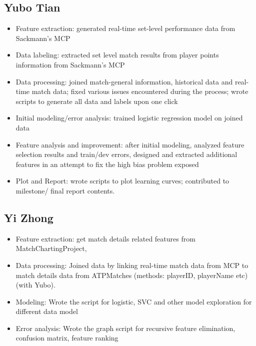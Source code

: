 \documentclass[paper=a4, fontsize=10pt]{scrartcl} %
\numberwithin{equation}{section} %
\numberwithin{figure}{section} %
\numberwithin{table}{section} %
\begin{document}
\subsection{Yubo Tian}
\begin{itemize}
\item Feature extraction: generated real-time set-level performance data from Sackmann's MCP \cite{tennis_charting}
\item Data labeling: extracted set level match results from player points information from Sackmann's MCP \cite{tennis_charting}
\item Data processing: joined match-general information, historical data and real-time match data; fixed various issues encountered during the process; wrote scripts to generate all data and labels upon one click
\item Initial modeling/error analysis: trained logistic regression model on joined data
\item Feature analysis and improvement: after initial modeling, analyzed feature selection results and train/dev errors, designed and extracted additional features in an attempt to fix the high bias problem exposed
\item Plot and Report: wrote scripts to plot learning curves; contributed to milestone/ final report contents.
\end{itemize}

\subsection{Yi Zhong}
\begin{itemize}
\item Feature extraction: get match details related features from MatchChartingProject, 
\item Data processing: Joined data by linking real-time match data from MCP \cite{tennis_charting} to match details data from ATPMatches \cite{tennis_atp} (methods: playerID, playerName etc) (with Yubo).
\item Modeling: Wrote the script for logistic, SVC and other model exploration for different data model
\item Error analysis: Wrote the graph script for recursive feature elimination, confusion matrix, feature ranking
\end{itemize}


 
\end{document}
